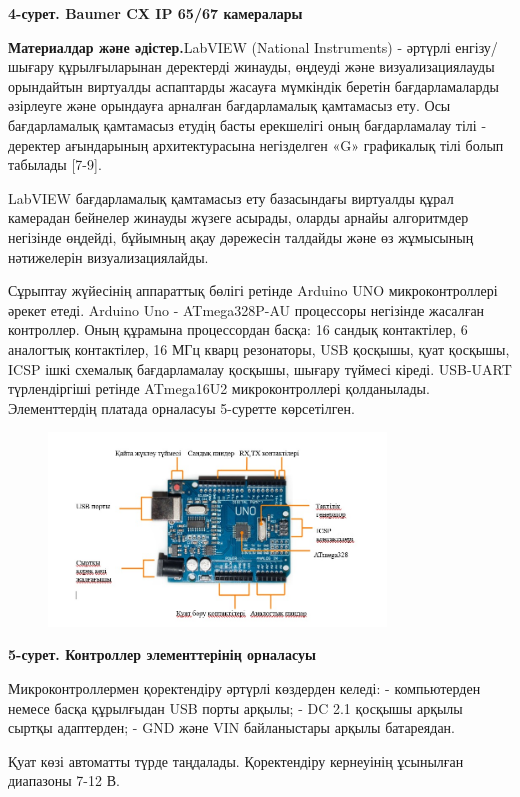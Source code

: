 {\bfseries 4-сурет. Baumer CX IP 65/67 камералары}

{\bfseries Материалдар және әдістер.}LabVIEW (National Instruments) -
әртүрлі енгізу/шығару құрылғыларынан деректерді жинауды, өңдеуді және
визуализациялауды орындайтын виртуалды аспаптарды жасауға мүмкіндік
беретін бағдарламаларды әзірлеуге және орындауға арналған бағдарламалық
қамтамасыз ету. Осы бағдарламалық қамтамасыз етудің басты ерекшелігі
оның бағдарламалау тілі - деректер ағындарының архитектурасына
негізделген «G» графикалық тілі болып табылады {[}7-9{]}.

LabVIEW бағдарламалық қамтамасыз ету базасындағы виртуалды құрал
камерадан бейнелер жинауды жүзеге асырады, оларды арнайы алгоритмдер
негізінде өңдейді, бұйымның ақау дәрежесін талдайды және өз жұмысының
нәтижелерін визуализациялайды.

Сұрыптау жүйесінің аппараттық бөлігі ретінде Arduino UNO
микроконтроллері әрекет етеді. Arduino Uno - ATmega328P-AU процессоры
негізінде жасалған контроллер. Оның құрамына процессордан басқа: 16
сандық контактілер, 6 аналогтық контактілер, 16 МГц кварц резонаторы,
USB қосқышы, қуат қосқышы, ICSP ішкі схемалық бағдарламалау қосқышы,
шығару түймесі кіреді. USB-UART түрлендіргіші ретінде ATmega16U2
микроконтроллері қолданылады. Элементтердің платада орналасуы 5-суретте
көрсетілген.


\begin{figure}[H]
	\centering
	\includegraphics[width=0.8\textwidth]{media/ict2/image173}
	\caption*{}
\end{figure}


{\bfseries 5-сурет. Контроллер элементтерінің орналасуы}

Микроконтроллермен қоректендіру әртүрлі көздерден келеді: - компьютерден
немесе басқа құрылғыдан USB порты арқылы; - DC 2.1 қосқышы арқылы сыртқы
адаптерден; - GND және VIN байланыстары арқылы батареядан.

Қуат көзі автоматты түрде таңдалады. Қоректендіру кернеуінің ұсынылған
диапазоны 7-12 В.

